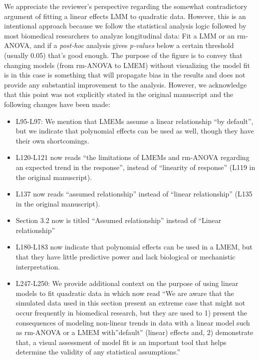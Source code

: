 \documentclass[
]{article}
\begin{document}
We appreciate the reviewer's perspective regarding the somewhat contradictory argument of fitting a linear effects LMM to quadratic data. However, this is an intentional approach because we follow the statistical analysis logic followed by most biomedical researchers to analyze longitudinal data: Fit a LMM or an rm-ANOVA, and if a \emph{post-hoc} analysis gives \emph{p-values} below a certain threshold (usually 0.05) that's good enough. The purpose of the figure is to convey that changing models (from rm-ANOVA to LMEM) without visualizing the model fit is in this case is something that will propagate bias in the results and does not provide any substantial improvement to the analysis. However, we acknowledge that this point was not explicitly stated in the original manuscript and the following changes have been made:

\begin{itemize}
\item
  L95-L97: We mention that LMEMs assume a linear relationship ``by default'', but we indicate that polynomial effects can be used as well, though they have their own shortcomings.
\item
  L120-L121 now reads ``the limitations of LMEMs and rm-ANOVA regarding an expected trend in the response'', instead of ``linearity of response'' (L119 in the original manuscript).
\item
  L137 now reads ``assumed relationship'' instead of ``linear relationship'' (L135 in the original manuscript).
\item
  Section 3.2 now is titled ``Assumed relationship'' instead of ``Linear relationship''
\item
  L180-L183 now indicate that polynomial effects can be used in a LMEM, but that they have little predictive power and lack biological or mechanistic interpretation.
\item
  L247-L250: We provide additional context on the purpose of using linear models to fit quadratic data in which now read ``We are aware that the simulated data used in this section present an extreme case that might not occur frequently in biomedical research, but they are used to 1) present the consequences of modeling non-linear trends in data with a linear model such as rm-ANOVA or a LMEM with''default'' (linear) effects and, 2) demonstrate that, a visual assessment of model fit is an important tool that helps determine the validity of any statistical assumptions.''
\end{itemize}
\end{document}
